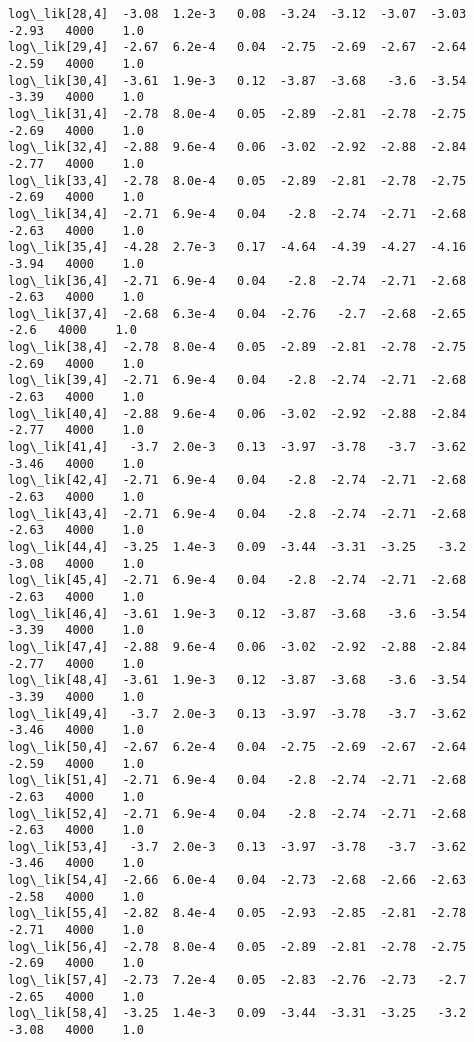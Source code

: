 \documentclass[11pt]{article}
\begin{document}
\begin{Verbatim}[commandchars=\\\{\}]
log\_lik[28,4]  -3.08  1.2e-3   0.08  -3.24  -3.12  -3.07  -3.03  -2.93   4000    1.0
log\_lik[29,4]  -2.67  6.2e-4   0.04  -2.75  -2.69  -2.67  -2.64  -2.59   4000    1.0
log\_lik[30,4]  -3.61  1.9e-3   0.12  -3.87  -3.68   -3.6  -3.54  -3.39   4000    1.0
log\_lik[31,4]  -2.78  8.0e-4   0.05  -2.89  -2.81  -2.78  -2.75  -2.69   4000    1.0
log\_lik[32,4]  -2.88  9.6e-4   0.06  -3.02  -2.92  -2.88  -2.84  -2.77   4000    1.0
log\_lik[33,4]  -2.78  8.0e-4   0.05  -2.89  -2.81  -2.78  -2.75  -2.69   4000    1.0
log\_lik[34,4]  -2.71  6.9e-4   0.04   -2.8  -2.74  -2.71  -2.68  -2.63   4000    1.0
log\_lik[35,4]  -4.28  2.7e-3   0.17  -4.64  -4.39  -4.27  -4.16  -3.94   4000    1.0
log\_lik[36,4]  -2.71  6.9e-4   0.04   -2.8  -2.74  -2.71  -2.68  -2.63   4000    1.0
log\_lik[37,4]  -2.68  6.3e-4   0.04  -2.76   -2.7  -2.68  -2.65   -2.6   4000    1.0
log\_lik[38,4]  -2.78  8.0e-4   0.05  -2.89  -2.81  -2.78  -2.75  -2.69   4000    1.0
log\_lik[39,4]  -2.71  6.9e-4   0.04   -2.8  -2.74  -2.71  -2.68  -2.63   4000    1.0
log\_lik[40,4]  -2.88  9.6e-4   0.06  -3.02  -2.92  -2.88  -2.84  -2.77   4000    1.0
log\_lik[41,4]   -3.7  2.0e-3   0.13  -3.97  -3.78   -3.7  -3.62  -3.46   4000    1.0
log\_lik[42,4]  -2.71  6.9e-4   0.04   -2.8  -2.74  -2.71  -2.68  -2.63   4000    1.0
log\_lik[43,4]  -2.71  6.9e-4   0.04   -2.8  -2.74  -2.71  -2.68  -2.63   4000    1.0
log\_lik[44,4]  -3.25  1.4e-3   0.09  -3.44  -3.31  -3.25   -3.2  -3.08   4000    1.0
log\_lik[45,4]  -2.71  6.9e-4   0.04   -2.8  -2.74  -2.71  -2.68  -2.63   4000    1.0
log\_lik[46,4]  -3.61  1.9e-3   0.12  -3.87  -3.68   -3.6  -3.54  -3.39   4000    1.0
log\_lik[47,4]  -2.88  9.6e-4   0.06  -3.02  -2.92  -2.88  -2.84  -2.77   4000    1.0
log\_lik[48,4]  -3.61  1.9e-3   0.12  -3.87  -3.68   -3.6  -3.54  -3.39   4000    1.0
log\_lik[49,4]   -3.7  2.0e-3   0.13  -3.97  -3.78   -3.7  -3.62  -3.46   4000    1.0
log\_lik[50,4]  -2.67  6.2e-4   0.04  -2.75  -2.69  -2.67  -2.64  -2.59   4000    1.0
log\_lik[51,4]  -2.71  6.9e-4   0.04   -2.8  -2.74  -2.71  -2.68  -2.63   4000    1.0
log\_lik[52,4]  -2.71  6.9e-4   0.04   -2.8  -2.74  -2.71  -2.68  -2.63   4000    1.0
log\_lik[53,4]   -3.7  2.0e-3   0.13  -3.97  -3.78   -3.7  -3.62  -3.46   4000    1.0
log\_lik[54,4]  -2.66  6.0e-4   0.04  -2.73  -2.68  -2.66  -2.63  -2.58   4000    1.0
log\_lik[55,4]  -2.82  8.4e-4   0.05  -2.93  -2.85  -2.81  -2.78  -2.71   4000    1.0
log\_lik[56,4]  -2.78  8.0e-4   0.05  -2.89  -2.81  -2.78  -2.75  -2.69   4000    1.0
log\_lik[57,4]  -2.73  7.2e-4   0.05  -2.83  -2.76  -2.73   -2.7  -2.65   4000    1.0
log\_lik[58,4]  -3.25  1.4e-3   0.09  -3.44  -3.31  -3.25   -3.2  -3.08   4000    1.0

\end{Verbatim}
\end{document}
